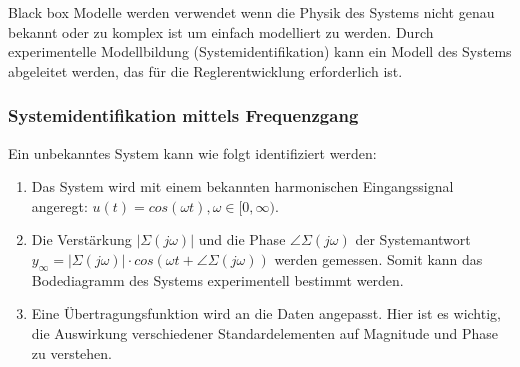             Black box Modelle werden verwendet wenn die Physik des Systems nicht genau bekannt oder zu komplex ist um einfach modelliert zu werden. Durch experimentelle Modellbildung (Systemidentifikation) kann ein Modell des Systems abgeleitet werden, das für die Reglerentwicklung erforderlich ist. 
            
        \subsubsection{Systemidentifikation mittels Frequenzgang}
            Ein unbekanntes System kann wie folgt identifiziert werden:
            \begin{enumerate}
                \item Das System wird mit einem bekannten harmonischen Eingangssignal angeregt: $u(t) = cos(\omega t),\omega \in [0,\infty).$
                \item Die Verstärkung $|\Sigma(j\omega)|$ und die Phase $\angle\Sigma(j\omega)$ der Systemantwort $y_\infty = |\Sigma(j\omega)| \cdot cos(\omega t + \angle\Sigma(j\omega))$ werden gemessen. Somit kann das Bodediagramm des Systems experimentell bestimmt werden.
                \item Eine Übertragungsfunktion wird an die Daten angepasst. Hier ist es wichtig, die Auswirkung verschiedener Standardelementen auf Magnitude und Phase zu verstehen.
            \end{enumerate}